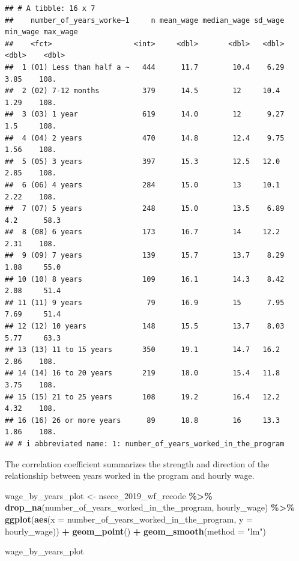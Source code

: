 \documentclass[
]{article}
\newenvironment{Shaded}{\begin{snugshade}}{\end{snugshade}}
\newcommand{\AttributeTok}[1]{\textcolor[rgb]{0.13,0.29,0.53}{#1}}
\newcommand{\FunctionTok}[1]{\textcolor[rgb]{0.13,0.29,0.53}{\textbf{#1}}}
\newcommand{\NormalTok}[1]{#1}
\newcommand{\OtherTok}[1]{\textcolor[rgb]{0.56,0.35,0.01}{#1}}
\newcommand{\SpecialCharTok}[1]{\textcolor[rgb]{0.81,0.36,0.00}{\textbf{#1}}}
\newcommand{\StringTok}[1]{\textcolor[rgb]{0.31,0.60,0.02}{#1}}
\begin{document}
\begin{verbatim}
## # A tibble: 16 x 7
##    number_of_years_worke~1     n mean_wage median_wage sd_wage min_wage max_wage
##    <fct>                   <int>     <dbl>       <dbl>   <dbl>    <dbl>    <dbl>
##  1 (01) Less than half a ~   444      11.7        10.4    6.29     3.85    108. 
##  2 (02) 7-12 months          379      14.5        12     10.4      1.29    108. 
##  3 (03) 1 year               619      14.0        12      9.27     1.5     108. 
##  4 (04) 2 years              470      14.8        12.4    9.75     1.56    108. 
##  5 (05) 3 years              397      15.3        12.5   12.0      2.85    108. 
##  6 (06) 4 years              284      15.0        13     10.1      2.22    108. 
##  7 (07) 5 years              248      15.0        13.5    6.89     4.2      58.3
##  8 (08) 6 years              173      16.7        14     12.2      2.31    108. 
##  9 (09) 7 years              139      15.7        13.7    8.29     1.88     55.0
## 10 (10) 8 years              109      16.1        14.3    8.42     2.08     51.4
## 11 (11) 9 years               79      16.9        15      7.95     7.69     51.4
## 12 (12) 10 years             148      15.5        13.7    8.03     5.77     63.3
## 13 (13) 11 to 15 years       350      19.1        14.7   16.2      2.86    108. 
## 14 (14) 16 to 20 years       219      18.0        15.4   11.8      3.75    108. 
## 15 (15) 21 to 25 years       108      19.2        16.4   12.2      4.32    108. 
## 16 (16) 26 or more years      89      18.8        16     13.3      1.86    108. 
## # i abbreviated name: 1: number_of_years_worked_in_the_program
\end{verbatim}

The correlation coefficient summarizes the strength and direction of the
relationship between years worked in the program and hourly wage.

\begin{Shaded}
\begin{Highlighting}[]
\NormalTok{wage\_by\_years\_plot }\OtherTok{\textless{}{-}}
\NormalTok{  nsece\_2019\_wf\_recode }\SpecialCharTok{\%\textgreater{}\%}
  \FunctionTok{drop\_na}\NormalTok{(number\_of\_years\_worked\_in\_the\_program, hourly\_wage) }\SpecialCharTok{\%\textgreater{}\%}
  \FunctionTok{ggplot}\NormalTok{(}\FunctionTok{aes}\NormalTok{(}\AttributeTok{x =}\NormalTok{ number\_of\_years\_worked\_in\_the\_program,}
             \AttributeTok{y =}\NormalTok{ hourly\_wage)) }\SpecialCharTok{+}
  \FunctionTok{geom\_point}\NormalTok{() }\SpecialCharTok{+}
  \FunctionTok{geom\_smooth}\NormalTok{(}\AttributeTok{method =} \StringTok{"lm"}\NormalTok{)}

\NormalTok{wage\_by\_years\_plot}
\end{Highlighting}
\end{Shaded}
\end{document}

